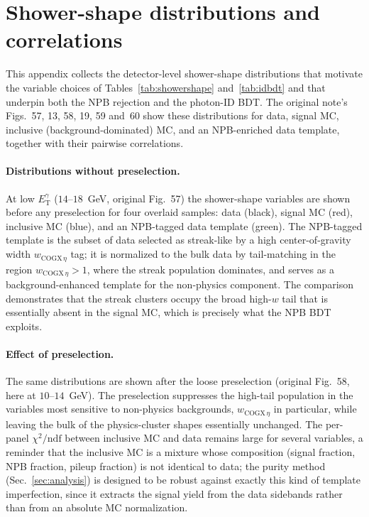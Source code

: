 \documentclass[11pt]{article}
\newcommand{\ETg}{E_{\mathrm{T}}^{\gamma}}
\begin{document}
\section{Shower-shape distributions and correlations}
\label{app:showershape}
This appendix collects the detector-level shower-shape distributions that
motivate the variable choices of Tables~\ref{tab:showershape} and~\ref{tab:idbdt}
and that underpin both the NPB rejection and the photon-ID BDT. The original
note's Figs.~57, 13, 58, 19, 59 and~60 show these distributions for data, signal
MC, inclusive (background-dominated) MC, and an NPB-enriched data template,
together with their pairwise correlations.

\paragraph{Distributions without preselection.} At low $\ETg$ ($14$--$18$~GeV,
original Fig.~57) the shower-shape variables are shown before any preselection
for four overlaid samples: data (black), signal MC (red), inclusive MC (blue),
and an NPB-tagged data template (green). The NPB-tagged template is the subset of
data selected as streak-like by a high center-of-gravity width
$w_{\mathrm{COGX}\,\eta}$ tag; it is normalized to the bulk data by tail-matching
in the region $w_{\mathrm{COGX}\,\eta} > 1$, where the streak population
dominates, and serves as a background-enhanced template for the non-physics
component. The comparison demonstrates that the streak clusters occupy the broad
high-$w$ tail that is essentially absent in the signal MC, which is precisely
what the NPB BDT exploits.

\paragraph{Effect of preselection.} The same distributions are shown after the
loose preselection (original Fig.~58, here at $10$--$14$~GeV). The preselection
suppresses the high-tail population in the variables most sensitive to
non-physics backgrounds, $w_{\mathrm{COGX}\,\eta}$ in particular, while leaving
the bulk of the physics-cluster shapes essentially unchanged. The per-panel
$\chi^2/\mathrm{ndf}$ between inclusive MC and data remains large for several
variables, a reminder that the inclusive MC is a mixture whose composition
(signal fraction, NPB fraction, pileup fraction) is not identical to data; the
purity method (Sec.~\ref{sec:analysis}) is designed to be robust against exactly
this kind of template imperfection, since it extracts the signal yield from the
data sidebands rather than from an absolute MC normalization.
\end{document}
